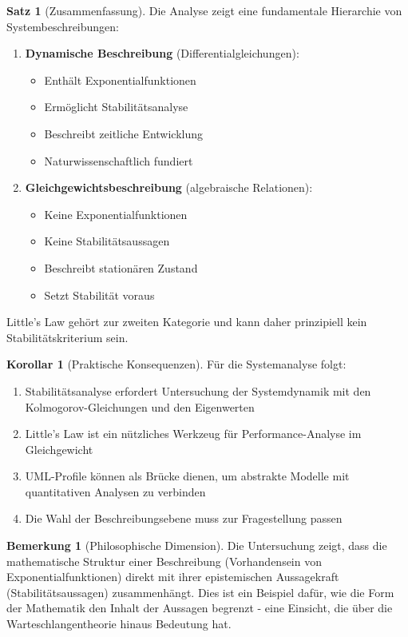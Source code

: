 ﻿\documentclass[a4paper,12pt]{scrreprt}
\theoremstyle{definition}
\newtheorem{bemerkung}{Bemerkung}[section]
\newtheorem{satz}{Satz}[section]
\newtheorem{korollar}{Korollar}[section]
\begin{document}
\begin{satz}[Zusammenfassung]
	Die Analyse zeigt eine fundamentale Hierarchie von Systembeschreibungen:
	\begin{enumerate}
		\item[-] \textbf{Dynamische Beschreibung} (Differentialgleichungen):
		\begin{itemize}
			\item[-] Enthält Exponentialfunktionen
			\item[-] Ermöglicht Stabilitätsanalyse
			\item[-] Beschreibt zeitliche Entwicklung
			\item[-] Naturwissenschaftlich fundiert
		\end{itemize}
		
		\item[-] \textbf{Gleichgewichtsbeschreibung} (algebraische Relationen):
		\begin{itemize}
			\item[-] Keine Exponentialfunktionen
			\item[-] Keine Stabilitätsaussagen
			\item[-] Beschreibt stationären Zustand
			\item[-] Setzt Stabilität voraus
		\end{itemize}
	\end{enumerate}
	
	Little's Law gehört zur zweiten Kategorie und kann daher prinzipiell kein Stabilitätskriterium sein.
\end{satz}

\begin{korollar}[Praktische Konsequenzen]
	Für die Systemanalyse folgt:
	\begin{enumerate}
		\item[-] Stabilitätsanalyse erfordert Untersuchung der Systemdynamik mit den Kolmogorov-Gleichun\-gen und den Eigenwerten
		\item[-] Little's Law ist ein nützliches Werkzeug für Performance-Analyse im Gleichgewicht
		\item[-] UML-Profile können als Brücke dienen, um abstrakte Modelle mit quantitativen Analysen zu verbinden
		\item[-] Die Wahl der Beschreibungsebene muss zur Fragestellung passen
	\end{enumerate}
\end{korollar}

\begin{bemerkung}[Philosophische Dimension]
	Die Untersuchung zeigt, dass die mathematische Struktur einer Beschreibung (Vorhandensein von Exponentialfunktionen) direkt mit ihrer epistemischen Aussagekraft (Stabilitätsaussagen) zusammenhängt. Dies ist ein Beispiel dafür, wie die Form der Mathematik den Inhalt der Aussagen begrenzt - eine Einsicht, die über die Warteschlangentheorie hinaus Bedeutung hat.
\end{bemerkung}
\end{document}
